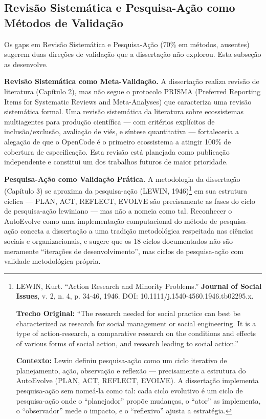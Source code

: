 \subsection{Revisão Sistemática e Pesquisa-Ação como Métodos de Validação}

Os gaps em Revisão Sistemática e Pesquisa-Ação (70\% em métodos, ausentes) sugerem duas direções de validação que a dissertação não explorou. Esta subseção as desenvolve.

\textbf{Revisão Sistemática como Meta-Validação.} A dissertação realiza revisão de literatura (Capítulo 2), mas não segue o protocolo PRISMA (Preferred Reporting Items for Systematic Reviews and Meta-Analyses) que caracteriza uma revisão sistemática formal. Uma revisão sistemática da literatura sobre ecossistemas multiagentes para produção científica --- com critérios explícitos de inclusão/exclusão, avaliação de viés, e síntese quantitativa --- fortaleceria a alegação de que o OpenCode é o primeiro ecossistema a atingir 100\% de cobertura de especificação. Esta revisão está planejada como publicação independente e constitui um dos trabalhos futuros de maior prioridade.

\textbf{Pesquisa-Ação como Validação Prática.} A metodologia da dissertação (Capítulo 3) se aproxima da pesquisa-ação (LEWIN, 1946)\footnote{
  LEWIN, Kurt. ``Action Research and Minority Problems.'' \textbf{Journal of Social Issues}, v. 2, n. 4, p. 34-46, 1946. DOI: 10.1111/j.1540-4560.1946.tb02295.x.

  \textbf{Trecho Original:} ``The research needed for social practice can best be characterized as research for social management or social engineering. It is a type of action-research, a comparative research on the conditions and effects of various forms of social action, and research leading to social action.''

  \textbf{Contexto:} Lewin definiu pesquisa-ação como um ciclo iterativo de planejamento, ação, observação e reflexão --- precisamente a estrutura do AutoEvolve (PLAN, ACT, REFLECT, EVOLVE). A dissertação implementa pesquisa-ação sem nomeá-la como tal: cada ciclo evolutivo é um ciclo de pesquisa-ação onde o ``planejador'' propõe mudanças, o ``ator'' as implementa, o ``observador'' mede o impacto, e o ``reflexivo'' ajusta a estratégia.
} em sua estrutura cíclica --- PLAN, ACT, REFLECT, EVOLVE são precisamente as fases do ciclo de pesquisa-ação lewiniano --- mas não a nomeia como tal. Reconhecer o AutoEvolve como uma implementação computacional do método de pesquisa-ação conecta a dissertação a uma tradição metodológica respeitada nas ciências sociais e organizacionais, e sugere que os 18 ciclos documentados não são meramente ``iterações de desenvolvimento'', mas ciclos de pesquisa-ação com validade metodológica própria.

